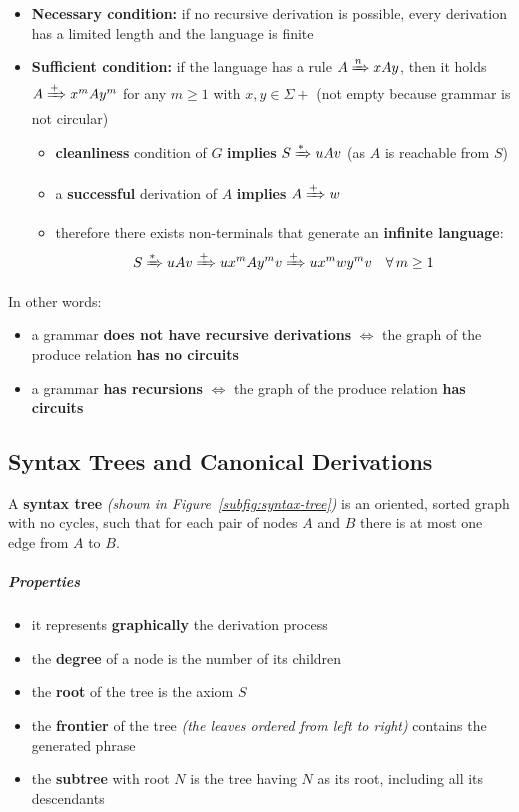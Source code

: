 \documentclass[english]{article}
\begin{document}
\begin{itemize}
  \item \textbf{Necessary condition:} if no recursive derivation is possible, every derivation has a limited length and the language is finite
  \item \textbf{Sufficient condition:} if the language has a rule \(A \xRightarrow{n} x A y\), then it holds \(A \xRightarrow{+} x^m A y^m\) for any \(m \geq 1\) with \(x, y \in \Sigma+\) (not empty because grammar is not circular)
        \begin{itemize}
          \item \textbf{cleanliness} condition of \(G\) \textbf{implies} \(S \xRightarrow{\ast} uAv\) (as \(A\) is reachable from \(S\))
          \item a \textbf{successful} derivation of \(A\) \textbf{implies} \(A \xRightarrow{+} w\)
          \item therefore there exists non-terminals that generate an \textbf{infinite language}:
                \[ S \xRightarrow{\ast} uAv \xRightarrow{+}ux^m Ay^m v \xRightarrow{+} u x^m w y^m v \quad \forall \, m \geq 1 \]
        \end{itemize}
\end{itemize}

\bigskip
In other words:

\begin{itemize}
  \item a grammar \textbf{does not have recursive derivations} \(\Longleftrightarrow\) the graph of the produce relation \textbf{has no circuits}
  \item a grammar \textbf{has recursions} \(\Longleftrightarrow\) the graph of the produce relation \textbf{has circuits}
\end{itemize}

\subsection{Syntax Trees and Canonical Derivations}

A \textbf{syntax tree} \textit{(shown in Figure~\ref{subfig:syntax-tree})} is an oriented, sorted graph with no cycles, such that for each pair of nodes \(A\) and \(B\) there is at most one edge from \(A\) to \(B\).

\subparagraph*{Properties}

\begin{itemize}
  \item it represents \textbf{graphically} the derivation process
  \item the \textbf{degree} of a node is the number of its children
  \item the \textbf{root} of the tree is the axiom \(S\)
  \item the \textbf{frontier} of the tree \textit{(the leaves ordered from left to right)} contains the generated phrase
  \item the \textbf{subtree} with root \(N\) is the tree having \(N\) as its root, including all its descendants
\end{itemize}
\end{document}
